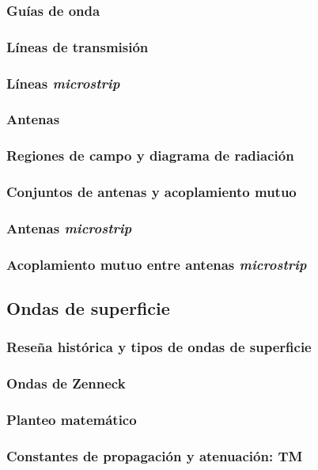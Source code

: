 \documentclass{beamer}
\begin{document}
			\begin{frame}
			\frametitle{Guías de onda}
			\end{frame}
	
			\begin{frame}
			\frametitle{Líneas de transmisión}
			\end{frame}
		
			\begin{frame}
			\frametitle{Líneas \textit{microstrip}}
			\end{frame}
		
		\subsubsection{Antenas}
		
			\begin{frame}
			\frametitle{Regiones de campo y diagrama de radiación}
			\end{frame}
		
			\begin{frame}
			\frametitle{Conjuntos de antenas y acoplamiento mutuo}
			\end{frame}
		
			\begin{frame}
			\frametitle{Antenas \textit{microstrip}}
			\end{frame}
		
			\begin{frame}
			\frametitle{Acoplamiento mutuo entre antenas \textit{microstrip}}
			\end{frame}
	
	
	\subsection{Ondas de superficie}
		\begin{frame}
		\frametitle{Reseña histórica y tipos de ondas de superficie}
		\end{frame}
		
		\subsubsection{Ondas de Zenneck}
			
			\begin{frame}
			\frametitle{Planteo matemático}
			\end{frame}
		
			\begin{frame}
			\frametitle{Constantes de propagación y atenuación: TM}
			\end{frame}	
		
\end{document}
